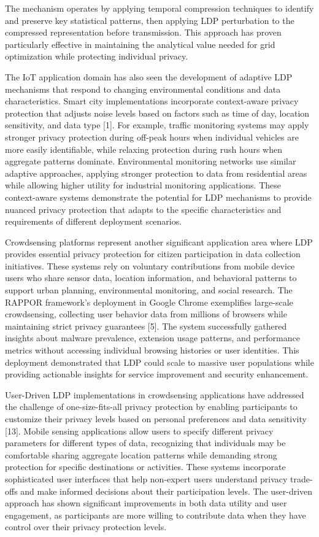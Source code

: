 \documentclass[conference]{IEEEtran}
\begin{document}
The mechanism operates by applying temporal compression techniques to identify and preserve key statistical patterns, then applying LDP perturbation to the compressed representation before transmission. This approach has proven particularly effective in maintaining the analytical value needed for grid optimization while protecting individual privacy.

The IoT application domain has also seen the development of adaptive LDP mechanisms that respond to changing environmental conditions and data characteristics. Smart city implementations incorporate context-aware privacy protection that adjusts noise levels based on factors such as time of day, location sensitivity, and data type [1]. For example, traffic monitoring systems may apply stronger privacy protection during off-peak hours when individual vehicles are more easily identifiable, while relaxing protection during rush hours when aggregate patterns dominate. Environmental monitoring networks use similar adaptive approaches, applying stronger protection to data from residential areas while allowing higher utility for industrial monitoring applications. These context-aware systems demonstrate the potential for LDP mechanisms to provide nuanced privacy protection that adapts to the specific characteristics and requirements of different deployment scenarios.

Crowdsensing platforms represent another significant application area where LDP provides essential privacy protection for citizen participation in data collection initiatives. These systems rely on voluntary contributions from mobile device users who share sensor data, location information, and behavioral patterns to support urban planning, environmental monitoring, and social research. The RAPPOR framework's deployment in Google Chrome exemplifies large-scale crowdsensing, collecting user behavior data from millions of browsers while maintaining strict privacy guarantees [5]. The system successfully gathered insights about malware prevalence, extension usage patterns, and performance metrics without accessing individual browsing histories or user identities. This deployment demonstrated that LDP could scale to massive user populations while providing actionable insights for service improvement and security enhancement.

User-Driven LDP implementations in crowdsensing applications have addressed the challenge of one-size-fits-all privacy protection by enabling participants to customize their privacy levels based on personal preferences and data sensitivity [13]. Mobile sensing applications allow users to specify different privacy parameters for different types of data, recognizing that individuals may be comfortable sharing aggregate location patterns while demanding strong protection for specific destinations or activities. These systems incorporate sophisticated user interfaces that help non-expert users understand privacy trade-offs and make informed decisions about their participation levels. The user-driven approach has shown significant improvements in both data utility and user engagement, as participants are more willing to contribute data when they have control over their privacy protection levels.
\end{document}
